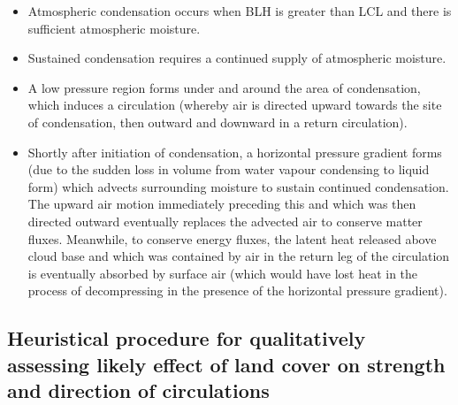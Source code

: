 \begin{itemize}
	\item Atmospheric condensation occurs when \ac{BLH} is greater than \ac{LCL} and there is sufficient atmospheric moisture.
	\item Sustained condensation requires a continued supply of atmospheric moisture.
	\item A low pressure region forms under and around the area of condensation, which induces a circulation (whereby air is directed upward towards the site of condensation, then outward and downward in a return circulation).
	\item Shortly after initiation of condensation, a horizontal pressure gradient forms (due to the sudden loss in volume from water vapour condensing to liquid form) which advects surrounding moisture to sustain continued condensation. The upward air motion immediately preceding this and which was then directed outward eventually replaces the advected air to conserve matter fluxes. Meanwhile, to conserve energy fluxes, the latent heat released above cloud base and which was contained by air in the return leg of the circulation is eventually absorbed by surface air (which would have lost heat in the process of decompressing in the presence of the horizontal pressure gradient).
\end{itemize}

\subsection{Heuristical procedure for qualitatively assessing likely effect of land cover on strength and direction of circulations}

